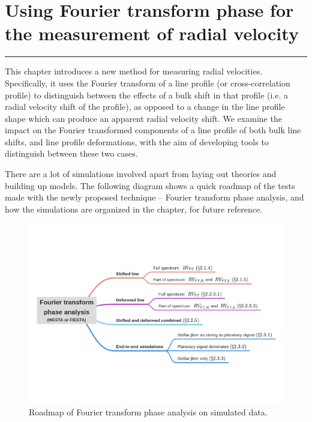 \chapter{Using Fourier transform phase for the measurement of radial velocity}
\label{\thechapter}
\label{ch:Methods}


\rule{\textwidth}{1.6pt}
\minitoc
\clearpage



This chapter introduces a new method for measuring radial velocities. Specifically, it uses the Fourier transform
of a line profile (or cross-correlation profile) to distinguish between the effects of a bulk shift in that profile (i.e. a radial velocity shift of the profile), as opposed to a change in the line profile shape which can produce an apparent radial velocity shift. We examine the impact on the Fourier transformed components of a line profile of both bulk line shifts, and line profile deformations, with the aim of developing tools to distinguish between these two cases.

There are a lot of simulations involved apart from laying out theories and building up models. The following diagram shows a quick roadmap of the tests made with the newly proposed technique -- Fourier transform phase analysis, and how the simulations are organized in the chapter, for future reference.
 
\begin{figure}[hbp]
\centering
\includegraphics[width = 1.0 \linewidth]
{./Figures/Methods/Thinkmap.png}
\caption[Simulation map]
{Roadmap of Fourier transform phase analysis on simulated data.}
\label{fig:simulation_map}
\end{figure} 

